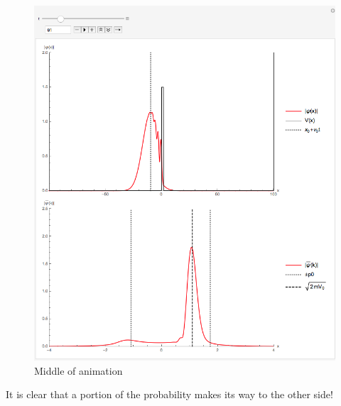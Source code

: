 \documentclass[titlepage]{article}
\begin{document}
\begin{figure}[ht]
\centering
\includegraphics[scale=0.5,center]{images/square2.png}
\caption{Middle of animation}
\label{fig:2d}
\end{figure}
\FloatBarrier

It is clear that a portion of the probability makes its way to the other side!
\end{document}
